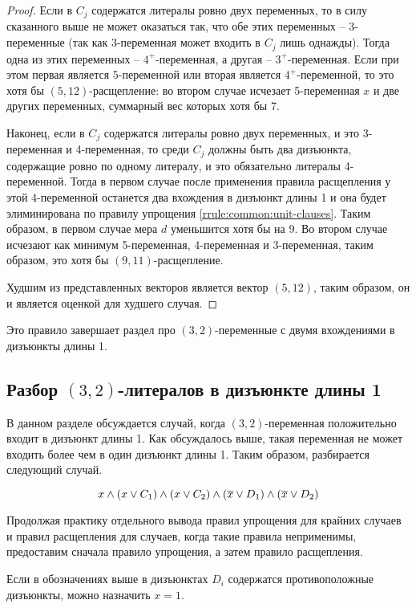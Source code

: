\begin{proof}
  Если в $C_j$ содержатся литералы ровно двух переменных, то в силу сказанного выше не может оказаться так, что обе этих переменных -- 3-переменные (так как 3-переменная может входить в $C_j$ лишь однажды). Тогда одна из этих переменных -- $4^+$-переменная, а другая -- $3^+$-переменная. Если при этом первая является $5$-переменной или вторая является $4^+$-переменной, то это хотя бы $(5,12)$-расщепление: во втором случае исчезает 5-переменная $x$ и две других переменных, суммарный вес которых хотя бы 7.

  Наконец, если в $C_j$ содержатся литералы ровно двух переменных, и это 3-переменная и 4-переменная, то среди $C_j$ должны быть два дизъюнкта, содержащие ровно по одному литералу, и это обязательно литералы 4-переменной. Тогда в первом случае после применения правила расщепления у этой 4-переменной останется два вхождения в дизъюнкт длины 1 и она будет элиминирована по правилу упрощения \ref{rrule:common:unit-clauses}. Таким образом, в первом случае мера $d$ уменьшится хотя бы на 9. Во втором случае исчезают как минимум 5-переменная, 4-переменная и 3-переменная, таким образом, это хотя бы $(9,11)$-расщепление.

  Худшим из представленных векторов является вектор $(5,12)$, таким образом, он и является оценкой для худшего случая.
\end{proof}

Это правило завершает раздел про $(3,2)$-переменные с двумя вхождениями в дизъюнкты длины 1.

\subsection{Разбор $(3,2)$-литералов в дизъюнкте длины 1}
\label{subsec:n5:32-+uc}

В данном разделе обсуждается случай, когда $(3,2)$-переменная положительно входит в дизъюнкт длины 1. Как обсуждалось выше, такая переменная не может входить более чем в один дизъюнкт длины 1. Таким образом, разбирается следующий случай.

$$
 x \wedge (x \vee C_1) \wedge (x \vee C_2) \wedge (\overline{x} \vee D_1) \wedge (\overline{x} \vee D_2)
$$

Продолжая практику отдельного вывода правил упрощения для крайних случаев и правил расщепления для случаев, когда такие правила неприменимы, предоставим сначала правило упрощения, а затем правило расщепления.

\begin{rrule}
 Если в обозначениях выше в дизъюнктах $D_i$ содержатся противоположные дизъюнкты, можно назначить $x = 1$.
 \label{rrule:n5:32-+uc}
\end{rrule}

